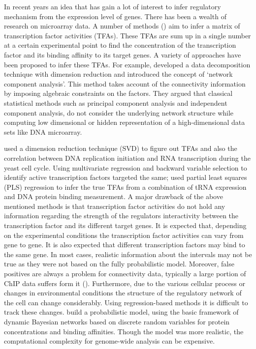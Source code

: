 In recent years an idea that has gain a lot of interest to infer regulatory mechanism from the expression level of genes. There has been a wealth of research on microarray data. A number of methods (\cite{Alter:2004, Gao:2004, Liao:2003}) aim to infer a matrix of transcription factor activities (TFAs). These TFAs are sum up in a single number at a certain experimental point to find the concentration of the transcription factor and its binding affinity to its target genes. A variety of approaches have been proposed to infer these TFAs. For example, \cite{Liao:2003} developed a data decomposition technique with dimension reduction and introduced the concept of ‘network component analysis’. This method takes account of the connectivity information by imposing algebraic constraints on the factors. They argued that classical statistical methods such as principal component analysis and independent component analysis, do not consider the underlying network structure while computing low dimensional or hidden representation of a high-dimensional data sets like DNA microarray. 

\cite{Alter:2004} used a dimension reduction technique (SVD) to figure out TFAs and also the correlation between DNA replication initiation and RNA transcription during the yeast cell cycle. Using multivariate regression and backward variable selection to identify active transcription factors \cite{Gao:2004} targeted the same; \cite{Boulesteix:2005} used partial least squares (PLS) regression to infer the true TFAs from a combination of tRNA expression and DNA protein binding measurement. A major drawback of the above mentioned methods is that transcription factor activities do not hold any information regarding the strength of the regulators interactivity between the transcription factor and its different target genes. It is expected that, depending on the experimental conditions the transcription factor activities can vary from gene to gene. It is also expected that different transcription factors may bind  to the same gene. In most cases, realistic information about the intervals may not be true as they were not based on the fully probabilistic model. Moreover, false positives are always a problem for connectivity data, typically a large portion of ChIP data suffers form it (\cite{Boulesteix:2005}). Furthermore, due to the various cellular process or changes in environmental conditions the structure of the regulatory network of the cell can change considerably. Using regression-based methods it is difficult to track these changes. \cite{Nachman:2004} build a probabilistic model, using the basic framework of dynamic Bayesian networks based on discrete random variables for protein concentrations and binding affinities. Though the model was more realistic, the computational complexity for genome-wide analysis can be expensive.

